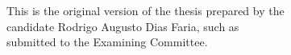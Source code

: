 \documentclass[11pt,twoside,a4paper]{book}
\theoremstyle{plain}
\theoremstyle{definition}
\begin{document}
    \vskip 2cm

    \begin{flushright}
	This is the original version of the thesis prepared by the \\
	candidate Rodrigo Augusto Dias Faria, such as \\
	submitted to the Examining Committee.
    \end{flushright}

\pagebreak


%
%
%
%





    
      
\end{document}
